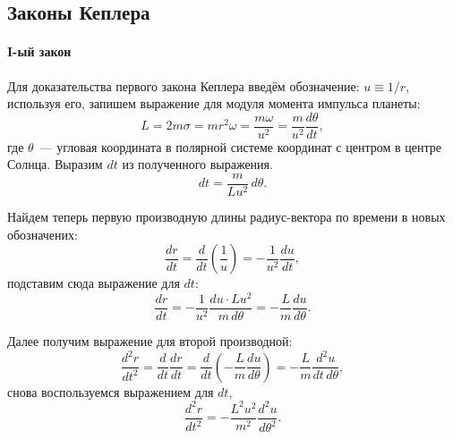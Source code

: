 \subsection{Законы Кеплера}

\paragraph{I-ый закон}
\label{sec:first-kepler-law} 

Для доказательства первого закона Кеплера введём обозначение: $u \equiv 1/r$, используя его, запишем выражение для модуля момента импульса планеты:
\begin{equation*}
    L = 2 m \sigma = m r^2 \omega = \frac{m \omega}{u^2} = \frac{m}{u^2} \frac{d \theta}{d t},
\end{equation*}
где $\theta$~--- угловая координата в полярной системе координат с центром в центре Солнца.
Выразим $dt$ из полученного выражения.
\begin{equation*}
    dt = \frac{m}{L u^2} \,d \theta.
\end{equation*}

Найдем теперь первую производную длины радиус-вектора по времени в новых обозначених:
\begin{equation*}
    \frac{d r}{d t} = \frac{d}{d t} \left( \frac{1}{u} \right) = - \frac{1}{u^2} \frac{du}{dt},
\end{equation*}
подставим сюда выражение для $dt$:
\begin{equation*}
    \frac{d r}{d t} = - \frac{1}{u^2} \frac{du \cdot L u^2}{m \,d \theta} = - \frac{L}{m} \frac{d u}{d \theta}.
\end{equation*}

Далее получим выражение для второй производной:
\begin{equation*}
    \frac{d^2 r}{dt^2} = \frac{d}{dt} \frac{d r}{d t} = \frac{d}{dt} \left( - \frac{L}{m} \frac{d u}{d \theta} \right) = -\frac{L}{m} \frac{d^2 u}{dt \,d \theta},
\end{equation*}
снова воспользуемся выражением для $dt$,
\begin{equation*}
    \frac{d^2 r}{dt^2} = - \frac{L^2 u^2}{m^2} \frac{d^2 u}{d \theta^2}.
\end{equation*}

